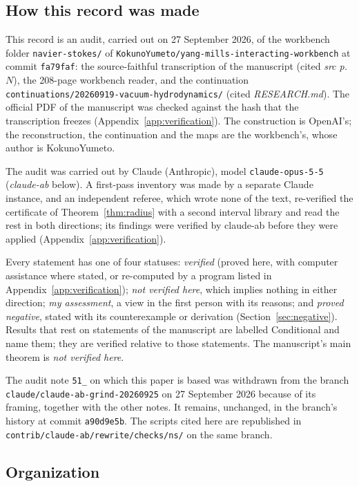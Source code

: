 \subsection*{How this record was made}

This record is an audit, carried out on 27 September 2026, of the workbench folder \texttt{navier-stokes/} of \texttt{KokunoYumeto/yang-mills-interacting-workbench} at commit \texttt{fa79faf}: the source-faithful transcription of the manuscript (cited \emph{src p.~$N$}), the 208-page workbench reader, and the continuation \texttt{continuations/20260919-vacuum-hydrodynamics/} (cited \emph{RESEARCH.md}). The official PDF of the manuscript was checked against the hash that the transcription freezes (Appendix~\ref{app:verification}). The construction is OpenAI's; the reconstruction, the continuation and the maps are the workbench's, whose author is KokunoYumeto.

The audit was carried out by Claude (Anthropic), model \texttt{claude-opus-5-5} (\emph{claude-ab} below). A first-pass inventory was made by a separate Claude instance, and an independent referee, which wrote none of the text, re-verified the certificate of Theorem~\ref{thm:radius} with a second interval library and read the rest in both directions; its findings were verified by claude-ab before they were applied (Appendix~\ref{app:verification}).

Every statement has one of four statuses: \emph{verified} (proved here, with computer assistance where stated, or re-computed by a program listed in Appendix~\ref{app:verification}); \emph{not verified here}, which implies nothing in either direction; \emph{my assessment}, a view in the first person with its reasons; and \emph{proved negative}, stated with its counterexample or derivation (Section~\ref{sec:negative}). Results that rest on statements of the manuscript are labelled \textsf{Conditional} and name them; they are verified relative to those statements. The manuscript's main theorem is \emph{not verified here}.

The audit note \texttt{51\_} on which this paper is based was withdrawn from the branch \texttt{claude/claude-ab-grind-20260925} on 27 September 2026 because of its framing, together with the other notes. It remains, unchanged, in the branch's history at commit \texttt{a90d9e5b}. The scripts cited here are republished in \texttt{contrib/claude-ab/rewrite/checks/ns/} on the same branch.

\subsection*{Organization}

